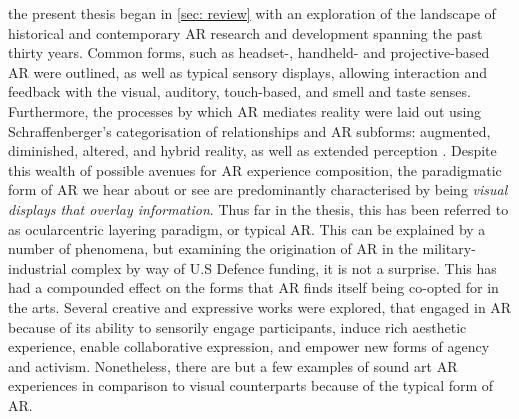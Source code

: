 \begin{itemize}
    \RQgenealogy
    \RQtheory
\end{itemize}

the present thesis began in \autoref{sec: review} with an exploration of the landscape of historical and contemporary AR research and development spanning the past thirty years. Common forms, such as headset-, handheld- and projective-based AR were outlined, as well as typical sensory displays, allowing interaction and feedback with the visual, auditory, touch-based, and smell and taste senses. Furthermore, the processes by which AR mediates reality were laid out using Schraffenberger's categorisation of relationships and AR subforms: augmented, diminished, altered, and hybrid reality, as well as extended perception \citep{schraffenberger2018}. Despite this wealth of possible avenues for AR experience composition, the paradigmatic form of AR we hear about or see are predominantly characterised by being \textit{visual displays that overlay information}. Thus far in the thesis, this has been referred to as ocularcentric layering paradigm, or typical AR. This can be explained by a number of phenomena, but examining the origination of AR in the military-industrial complex by way of U.S Defence funding, it is not a surprise. This has had a compounded effect on the forms that AR finds itself being co-opted for in the arts. Several creative and expressive works were explored, that engaged in AR because of its ability to sensorily engage participants, induce rich aesthetic experience, enable collaborative expression, and empower new forms of agency and activism. Nonetheless, there are but a few examples of sound art AR experiences in comparison to visual counterparts because of the typical form of AR.

